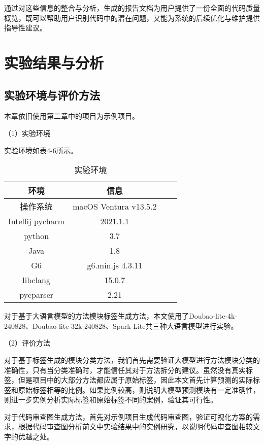 通过对这些信息的整合与分析，生成的报告文档为用户提供了一份全面的代码质量概览，既可以帮助用户识别代码中的潜在问题，又能为系统的后续优化与维护提供指导性建议。

\section{实验结果与分析}

\subsection{实验环境与评价方法}

本章依旧使用第二章中的项目为示例项目。

（1）实验环境

实验环境如表4-6所示。

\begin{table}[htbp]
\caption{实验环境}
\vspace{0.5em}\centering\wuhao
\begin{tabular}{cccc}
\toprule
    环境 & 信息 \\
\midrule
操作系统 & macOS Ventura v13.5.2  \\
Intellij pycharm & 2021.1.1   \\
python & 3.7   \\
Java & 1.8   \\
G6 & g6.min.js 4.3.11  \\  
libclang & 15.0.7  \\ 
pycparser & 2.21  \\
\bottomrule
\end{tabular}
\end{table}

对于基于大语言模型的方法模块标签生成方法，本文使用了Doubao-lite-4k-240828、Doubao-lite-32k-240828、Spark Lite共三种大语言模型进行实验。

（2）评价方法



对于基于标签生成的模块分类方法，我们首先需要验证大模型进行方法模块分类的准确性，只有当分类准确时，才能信任其对于方法拆分的建议。虽然没有真实标签，但是项目中的大部分方法都应属于原始标签，因此本文首先计算预测的实际标签和原始标签相等的比例。如果比例较高，则说明大模型预测模块有一定准确性，则进一步实例分析实际标签和原始标签不同的案例，验证其可行性。

对于代码审查图生成方法，首先对示例项目生成代码审查图，验证可视化方案的需求，根据代码审查图分析前文中实验结果中的实例研究，以说明代码审查图相较文字的优越之处。

